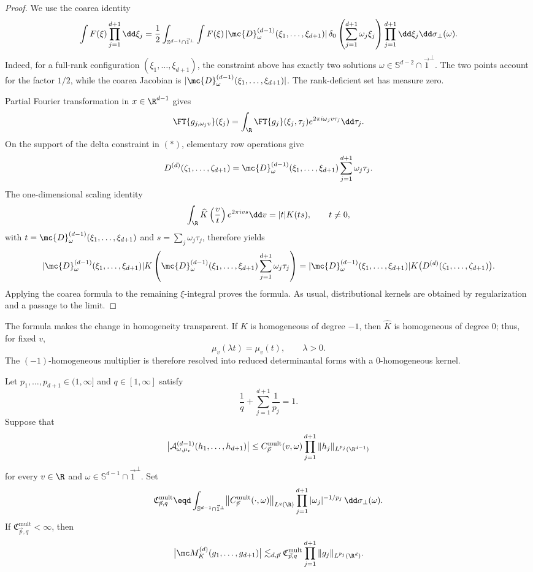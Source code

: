 \begin{proof}
We use the coarea identity
\[
\int F(\xi)\prod_{j=1}^{d+1}\dd\xi_j
    =\frac12\int_{\mathbb S^{d-1}\cap\vec1^\perp}\int F(\xi)\,
|\mc{D}^{(d-1)}_\omega(\xi_1,\ldots,\xi_{d+1})|\,
\delta_0\left(\sum_{j=1}^{d+1}\omega_j\xi_j\right)
\prod_{j=1}^{d+1}\dd\xi_j\dd\sigma_\perp(\omega).
\]
Indeed, for a full-rank configuration $(\xi_1,\ldots,\xi_{d+1})$, the
constraint above has exactly two solutions $\omega\in\mathbb {S}^{d-2}\cap\vec1^\perp$.
The two points account for the factor $1/2$, while the coarea Jacobian is $|\mc{D}^{(d-1)}_\omega(\xi_1,\ldots,\xi_{d+1})|$.
The rank-deficient set has measure zero.

  Partial Fourier transformation in $x\in\R^{d-1}$ gives
  \[
    \FT{g_{j,\omega_jv}}(\xi_j)
    =\int_\R\FT{g_j}(\xi_j,\tau_j)
    e^{2\pi i \omega_jv\tau_j}\dd\tau_j.
  \]
  On the support of the delta constraint in \((*)\), elementary row
  operations give
  \[
    D^{(d)}(\zeta_1,\ldots,\zeta_{d+1})
    =\mc{D}^{(d-1)}_\omega(\xi_1,\ldots,\xi_{d+1})
    \sum_{j=1}^{d+1}\omega_j\tau_j.
  \]
  The one-dimensional scaling identity
  \[
    \int_\R\widehat K\left(\frac vt\right)e^{2\pi ivs}\dd v
    =|t|K(ts),\qquad t\ne0,
  \]
  with $t=\mc{D}^{(d-1)}_\omega(\xi_1,\ldots,\xi_{d+1})$ and
  $s=\sum_j\omega_j\tau_j$, therefore yields
  \[
    |\mc{D}^{(d-1)}_\omega(\xi_1,\ldots,\xi_{d+1})|K\left(\mc{D}^{(d-1)}_\omega(\xi_1,\ldots,\xi_{d+1})
    \sum_{j=1}^{d+1}\omega_j\tau_j\right)
    =|\mc{D}^{(d-1)}_\omega(\xi_1,\ldots,\xi_{d+1})|
    K\bigl(D^{(d)}(\zeta_1,\ldots,\zeta_{d+1})\bigr).
  \]
  Applying the coarea formula to the remaining $\xi$-integral proves the formula.
  As usual, distributional kernels are obtained by regularization and a
  passage to the limit.
\end{proof}

The formula makes the change in homogeneity transparent.  If $K$ is
homogeneous of degree $-1$, then $\widehat K$ is homogeneous of degree $0$;
thus, for fixed $v$,
\[
  \mu_v(\lambda t)=\mu_v(t),\qquad \lambda>0.
\]
The $(-1)$-homogeneous multiplier is therefore resolved into reduced
determinantal forms with a $0$-homogeneous kernel.
\begin{corollary}
\label{cor:uniform-multiplier-sliced-bound}
Let $p_1,\ldots,p_{d+1}\in(1,\infty]$ and $q\in[1,\infty]$ satisfy
\[
  \frac{1}{q}+\sum_{j=1}^{d+1}\frac1{p_j}=1.
\]
Suppose that
\[
  \bigl|\mathcal A_{\omega,\mu_v}^{(d-1)}
  (h_1,\ldots,h_{d+1})\bigr|
  \le C_{\vec p}^{\mathrm{mult}}(v,\omega)
  \prod_{j=1}^{d+1}\|h_j\|_{L^{p_j}(\R^{d-1})}
\]
for every $v\in\R$ and $\omega\in\mathbb S^{d-1}\cap\vec1^\perp$.  Set
\[
  \mathfrak C_{\vec p,q}^{\mathrm{mult}}
  \eqd\int_{\mathbb S^{d-1}\cap\vec1^\perp}
  \bigl\|C_{\vec p}^{\mathrm{mult}}(\cdot,\omega)\bigr\|_{L^q(\R)}
  \prod_{j=1}^{d+1}|\omega_j|^{-1/p_j}\,
  \dd\sigma_\perp(\omega).
\]
If $\mathfrak C_{\vec p,q}^{\mathrm{mult}}<\infty$, then
\[
  \bigl|\mc M_K^{(d)}(g_1,\ldots,g_{d+1})\bigr|
  \lesssim_{d,\vec p}
  \mathfrak C_{\vec p,q}^{\mathrm{mult}}
  \prod_{j=1}^{d+1}\|g_j\|_{L^{p_j}(\R^d)}.
\]
\end{corollary}

